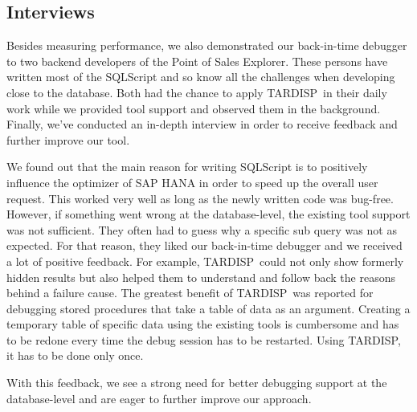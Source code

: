 \documentclass[english,conference]{IEEEtran}
\newcommand{\todo}[2][]{\pdfmargincomment[author={#1}]{#2}}
\newcommand{\tool}{TAR\-DISP}
\begin{document}


\subsection{Interviews}

Besides measuring performance, we also demonstrated our back-in-time debugger to two backend developers of the Point of Sales Explorer. 
These persons have written most of the SQLScript and so know all the challenges when developing close to the database. 
Both had the chance to apply \tool\ in their daily work while we provided tool support and observed them in the background. 
Finally, we've conducted an in-depth interview in order to receive feedback and further improve our tool.

We found out that the main reason for writing SQLScript is to positively influence the optimizer of SAP HANA in order to speed up the overall user request.
This worked very well as long as the newly written code was bug-free. 
However, if something went wrong at the database-level, the existing tool support was not sufficient. 
They often had to guess why a specific sub query was not as expected. 
For that reason, they liked our back-in-time debugger and we received a lot of positive feedback.
For example, \tool\ could not only show formerly hidden results but also helped them to understand and follow back the reasons behind a failure cause. 
The greatest benefit of \tool\ was reported for debugging stored procedures that take a table of data as an argument.
Creating a temporary table of specific data using the existing tools is cumbersome and has to be redone every time the debug session has to be restarted.
Using \tool, it has to be done only once.

With this feedback, we see a strong need for better debugging support at the database-level and are eager to further improve our approach.
\end{document}
